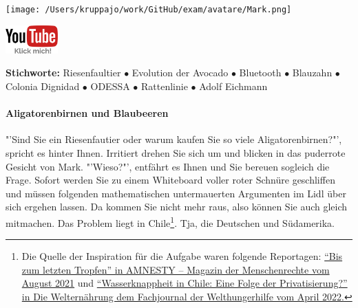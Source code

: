 \documentclass[a4paper, 9pt]{scrartcl}\usepackage[]{graphicx}\usepackage[]{xcolor}
\begin{document}
 
\ifcollection
\begin{flushright}
\tiny\vspace{-3Ex}
\textbf{\examinhaltstart}
\exammodulemathstat
\vspace{-4Ex}
\end{flushright}
\begin{minipage}[t]{0.5\textwidth}
\texttt{[image: /Users/kruppajo/work/GitHub/exam/avatare/Mark.png]}
\end{minipage}
\begin{minipage}[t]{0.5\textwidth}
\hfill
\href{https://youtu.be/https://youtu.be/k2G52hMIfqk}{\includegraphics[width = 2cm]{img/youtube}}
\end{minipage}
\fi

{\tiny\textbf{Stichworte:} Riesenfaultier $\bullet$ Evolution der Avocado $\bullet$ Bluetooth $ \bullet$ Blauzahn $\bullet$ Colonia Dignidad $\bullet$ ODESSA $\bullet$ Rattenlinie $\bullet$ Adolf Eichmann}



\ifcollection
\paragraph{Aligatorenbirnen und Blaubeeren}
\fi



"'Sind Sie ein Riesenfautier oder warum kaufen Sie so viele Aligatorenbirnen?"', spricht es hinter Ihnen. Irritiert drehen Sie sich um und blicken in das puderrote Gesicht von Mark. "'Wieso?"', entfährt es Ihnen und Sie bereuen sogleich die Frage. Sofort werden Sie zu einem Whiteboard voller roter Schnüre geschliffen und müssen folgenden mathematischen untermauerten Argumenten im Lidl über sich ergehen lassen. Da kommen Sie nicht mehr raus, also können Sie auch gleich mitmachen. Das Problem liegt in Chile\footnote{Die Quelle der Inspiration für die Aufgabe waren folgende Reportagen: \href{https://www.amnesty.ch/de/ueber-amnesty/publikationen/magazin-amnesty/2021-3/bis-zum-letzten-tropfen}{"`Bis zum letzten Tropfen"' in AMNESTY – Magazin der Menschenrechte vom August 2021} und \href{https://www.welthungerhilfe.de/welternaehrung/rubriken/klima-ressourcen/wassernot-in-chile-eine-folge-der-privatisierung}{"`Wasserknappheit in Chile: Eine Folge der Privatisierung?"' in Die Welternährung dem Fachjournal der Welthungerhilfe vom April 2022.}}. Tja, die Deutschen und Südamerika.\\
\end{document}
